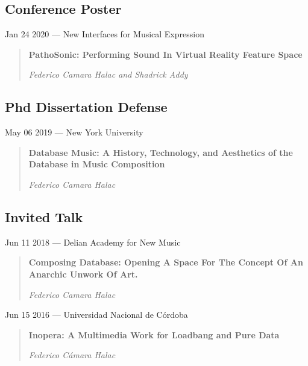 \documentclass[12pt,overlapped]{res}%
\begin{document}
\begin{resume}
\begin{quote}
\end{quote}%

%
%
%
\subsection{Conference Poster}%
Jan 24 2020 --- New Interfaces for Musical Expression%
\begin{quote}
\par
\textbf{PathoSonic: Performing Sound In Virtual Reality Feature Space}
\par
\textit{Federico Camara Halac and Shadrick Addy}

\end{quote}%
%
%
%
\subsection{Phd Dissertation Defense}%
May 06 2019 --- New York University%
\begin{quote}
\par
\textbf{Database Music: A History, Technology, and Aesthetics of the Database in Music Composition}
\par
\textit{Federico Camara Halac}

\end{quote}%
%
%
%
\subsection{Invited Talk}%
Jun 11 2018 --- Delian Academy for New Music%
\begin{quote}
\par
\textbf{Composing Database: Opening A Space For The Concept Of An Anarchic Unwork Of Art.}
\par
\textit{Federico Camara Halac}

\end{quote}%
Jun 15 2016 --- Universidad Nacional de Córdoba%
\begin{quote}
\par
\textbf{Inopera: A Multimedia Work for Loadbang and Pure Data}
\par
\textit{Federico Cámara Halac}


\end{quote}
\end{resume}
\end{document}
